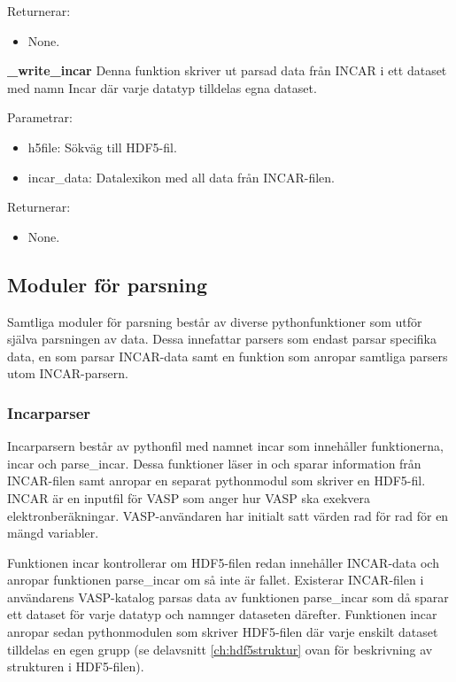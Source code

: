 \documentclass[a4paper,12pt]{article}
\begin{document}
Returnerar:
\begin{itemize}
\setlength\itemsep{0em}
\item None.
\end{itemize}

\textbf{\_write\_incar} \newline
Denna funktion skriver ut parsad data från INCAR i ett dataset med namn Incar där varje datatyp
tilldelas egna dataset.

Parametrar:
\begin{itemize}
\setlength\itemsep{0em}
\item h5file: Sökväg till HDF5-fil.
\item incar\_data: Datalexikon med all data från INCAR-filen.
\end{itemize}

Returnerar:
\begin{itemize}
\setlength\itemsep{0em}
\item None.
\end{itemize}

\subsection{Moduler för parsning}
Samtliga moduler för parsning består av diverse pythonfunktioner som utför själva parsningen av data. Dessa innefattar parsers som endast parsar specifika data, en som parsar INCAR-data samt en funktion som anropar samtliga parsers utom INCAR-parsern.

\subsubsection{Incarparser}
Incarparsern består av pythonfil med namnet incar som innehåller funktionerna, incar och parse\_incar. Dessa funktioner läser in och sparar information från INCAR-filen samt anropar en separat pythonmodul som skriver en HDF5-fil. INCAR är en inputfil för VASP som anger hur VASP ska exekvera elektronberäkningar. VASP-användaren har initialt satt värden rad för rad för en mängd variabler.

Funktionen incar kontrollerar om HDF5-filen redan innehåller INCAR-data och anropar funktionen parse\_incar om så inte är fallet. Existerar INCAR-filen i användarens VASP-katalog parsas data av funktionen parse\_incar som då sparar ett dataset för varje datatyp och namnger dataseten därefter. Funktionen incar anropar sedan pythonmodulen som skriver HDF5-filen där varje enskilt dataset tilldelas en egen grupp (se delavsnitt \ref{ch:hdf5struktur} ovan för beskrivning av strukturen i HDF5-filen).
\end{document}
